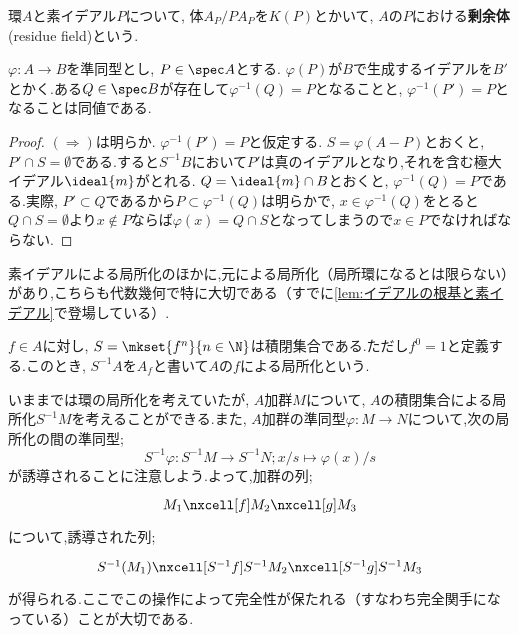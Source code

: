 \begin{defi}[剰余体]
	環$A$と素イデアル$P$について, 体$A_P/PA_P$を$K(P)$とかいて, $A$の$P$における\textbf{剰余体}(residue field)という.
\end{defi}

\begin{prop}\label{prop:上にイデアルがあることの同値条件}
	$\varphi:A\to B$を準同型とし, $P\in\spec A$とする. $\varphi(P)$が$B$で生成するイデアルを$B'$とかく.ある$Q\in\spec B$が存在して$\varphi^{-1}(Q)=P$となることと, $\varphi^{-1}(P')=P$となることは同値である.
\end{prop}

\begin{proof}
	$(\Longrightarrow)$は明らか. $\varphi^{-1}(P')=P$と仮定する. $S=\varphi(A-P)$とおくと, $P'\cap S=\emptyset$である.すると$S^{-1}B$において$P'$は真のイデアルとなり,それを含む極大イデアル$\ideal{m}$がとれる. $Q=\ideal{m}\cap B$とおくと, $\varphi^{-1}(Q)=P$である.実際, $P'\subset Q$であるから$P\subset\varphi^{-1}(Q)$は明らかで, $x\in\varphi^{-1}(Q)$をとると$Q\cap S=\emptyset$より$x\not\in P$ならば$\varphi(x)=Q\cap S$となってしまうので$x\in P$でなければならない.
\end{proof}

素イデアルによる局所化のほかに,元による局所化（局所環になるとは限らない）があり,こちらも代数幾何で特に大切である（すでに\ref{lem:イデアルの根基と素イデアル}で登場している）.
\begin{defi}
	$f\in A$に対し, $S=\mkset{f^n}{n\in\N}$は積閉集合である.ただし$f^0=1$と定義する.このとき, $S^{-1}A$を$A_f$と書いて$A$の$f$による局所化という.	
\end{defi}

いままでは環の局所化を考えていたが, $A$加群$M$について, $A$の積閉集合による局所化$S^{-1}M$を考えることができる.また, $A$加群の準同型$\varphi:M\to N$について,次の局所化の間の準同型;
\[S^{-1}\varphi:S^{-1}M\to S^{-1}N;x/s\mapsto \varphi(x)/s\]
が誘導されることに注意しよう.よって,加群の列;
\[\begin{tikzcd}
	M_1\nxcell[f]M_2\nxcell[g]M_3
\end{tikzcd}\]
について,誘導された列;
\[\begin{tikzcd}
S^{-1}(M_1)\nxcell[S^{-1}f]S^{-1}M_2\nxcell[S^{-1}g]S^{-1}M_3
\end{tikzcd}\]
が得られる.ここでこの操作によって完全性が保たれる（すなわち完全関手になっている）ことが大切である.

